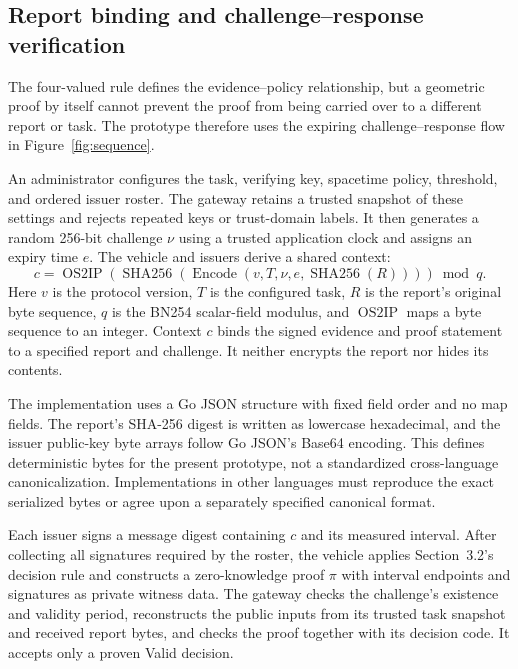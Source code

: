\subsection{Report binding and challenge--response verification}
The four-valued rule defines the evidence--policy relationship, but a geometric proof by itself cannot prevent the proof from being carried over to a different report or task. The prototype therefore uses the expiring challenge--response flow in Figure~\ref{fig:sequence}.

An administrator configures the task, verifying key, spacetime policy, threshold, and ordered issuer roster. The gateway retains a trusted snapshot of these settings and rejects repeated keys or trust-domain labels. It then generates a random 256-bit challenge $\nu$ using a trusted application clock and assigns an expiry time $e$. The vehicle and issuers derive a shared context:
\begin{equation}\label{eq:context}
c=\operatorname{OS2IP}\!\left(\operatorname{SHA256}\!\left(
\operatorname{Encode}(v,T,\nu,e,\operatorname{SHA256}(R))
\right)\right)\bmod q.
\end{equation}
Here $v$ is the protocol version, $T$ is the configured task, $R$ is the report's original byte sequence, $q$ is the BN254 scalar-field modulus, and $\operatorname{OS2IP}$ maps a byte sequence to an integer. Context $c$ binds the signed evidence and proof statement to a specified report and challenge. It neither encrypts the report nor hides its contents.

The implementation uses a Go JSON structure with fixed field order and no map fields. The report's SHA-256 digest is written as lowercase hexadecimal, and the issuer public-key byte arrays follow Go JSON's Base64 encoding. This defines deterministic bytes for the present prototype, not a standardized cross-language canonicalization. Implementations in other languages must reproduce the exact serialized bytes or agree upon a separately specified canonical format.

Each issuer signs a message digest containing $c$ and its measured interval. After collecting all signatures required by the roster, the vehicle applies Section~3.2's decision rule and constructs a zero-knowledge proof $\pi$ with interval endpoints and signatures as private witness data. The gateway checks the challenge's existence and validity period, reconstructs the public inputs from its trusted task snapshot and received report bytes, and checks the proof together with its decision code. It accepts only a proven Valid decision.

